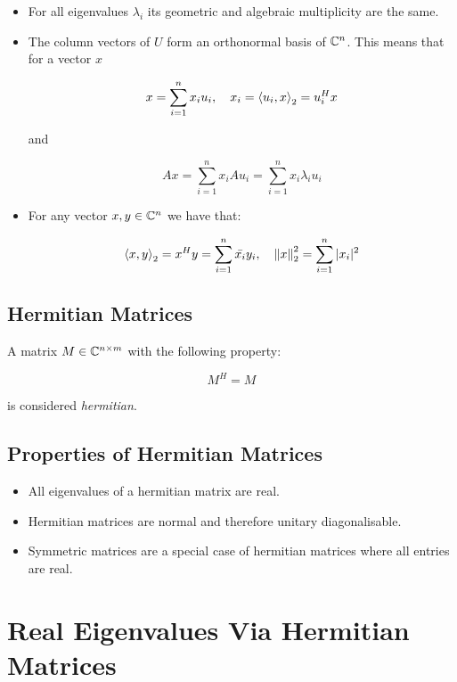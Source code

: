 \begin{itemize}

    \item For all eigenvalues \(\lambda_i\) its geometric and algebraic multiplicity are the same.

    \item The column vectors of \(U\) form an orthonormal basis of \(\mathbb{C}^n\).
    This means that for a vector \(x\)

    \[
        x = \sum_{i=1}^n x_i u_i, \quad x_i = \left\langle u_i, x\right\rangle_2 = u_i^H x
    \]

    and  

    \[
        Ax = \sum_{i = 1}^{n} x_i A u_i = \sum_{i = 1}^{n} x_i \lambda_i u_i
    \]

    \item For any vector \(x,y \in \mathbb{C}^n\) we have that:

    \[
        \left\langle x, y\right\rangle_2 = x^H y = \sum_{i = 1}^{n} \bar{x_i} y_i, \quad \left\| x \right\|_2^2 = \sum_{i = 1}^{n} |x_i|^2
    \]

\end{itemize}

\subsection{Hermitian Matrices}

A matrix \(M \in \mathbb{C}^{n \times m}\) with the following property:

\[
    M^H = M
\]

is considered \emph{hermitian}.

\subsection{Properties of Hermitian Matrices}

\begin{itemize}

    \item All eigenvalues of a hermitian matrix are real.

    \item Hermitian matrices are normal and therefore unitary diagonalisable.

    \item Symmetric matrices are a special case of hermitian matrices where all entries are real.

\end{itemize}

\section{Real Eigenvalues Via Hermitian Matrices}

